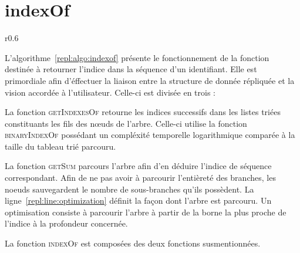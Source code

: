 \clearpage 

\section{indexOf}

\begin{wrapfigure}{r}{0.6\textwidth}
  \vspace{-35pt} %
  \begin{minipage}[t]{0.6\textwidth}
    \begin{algorithm}[H]
      
      \caption{\label{repl:algo:indexof} indexOf.}
    \end{algorithm}
  \end{minipage}
  \vspace{-15pt}
\end{wrapfigure}

L'algorithme~\ref{repl:algo:indexof} présente le fonctionnement de la fonction
destinée à retourner l'indice dans la séquence d'un identifiant. Elle est
primordiale afin d'éffectuer la liaison entre la structure de donnée répliquée
et la vision accordée à l'utilisateur. Celle-ci est divisée en trois :
\begin{inparaenum}[(i)]
\item La fonction \textsc{getIndexesOf} retourne les indices successifs dans les
  listes triées constituants les fils des nœuds de l'arbre. Celle-ci utilise la
  fonction \textsc{binaryIndexOf} possédant un compléxité temporelle
  logarithmique comparée à la taille du tableau trié parcouru.
\item La fonction \textsc{getSum} parcours l'arbre afin d'en déduire l'indice de
  séquence correspondant. Afin de ne pas avoir à parcourir l'entièreté des
  branches, les noeuds sauvegardent le nombre de sous-branches qu'ils possèdent.
  La ligne~\ref{repl:line:optimization} définit la façon dont l'arbre est
  parcouru. Un optimisation consiste à parcourir l'arbre à partir de la borne la
  plus proche de l'indice à la profondeur concernée.
\item La fonction \textsc{indexOf} est composées des deux fonctions
  susmentionnées.
\end{inparaenum}



